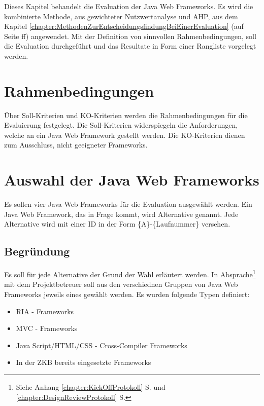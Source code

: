   Dieses Kapitel behandelt die Evaluation der Java Web Frameworks. Es wird die
  kombinierte Methode, aus gewichteter Nutzwertanalyse und \ac{AHP}, aus dem
  Kapitel \ref{chapter:MethodenZurEntscheidungsfindungBeiEinerEvaluation}
   (auf
  Seite \pageref{chapter:MethodenZurEntscheidungsfindungBeiEinerEvaluation}ff)
  angewendet. Mit der Definition von sinnvollen Rahmenbedingungen, soll die
  Evaluation durchgeführt und das Resultate in Form einer Rangliste vorgelegt
  werden.
    
  \section{Rahmenbedingungen}
  
  Über Soll-Kriterien und KO-Kriterien werden die Rahmenbedingungen für die
  Evaluierung festgelegt. Die Soll-Kriterien widerspiegeln die Anforderungen,
  welche an ein Java Web Framework gestellt werden. Die KO-Kriterien dienen zum
  Ausschluss, nicht geeigneter Frameworks.

  \section{Auswahl der Java Web Frameworks}
  
  Es sollen vier Java Web Frameworks für die Evaluation ausgewählt werden. Ein
  Java Web Framework, das in Frage kommt, wird Alternative genannt. Jede
  Alternative wird mit einer ID in der Form \{A\}-\{Laufnummer\} versehen.
  
  \subsection{Begründung}
  
  Es soll für jede Alternative der Grund der Wahl erläutert werden. In
  Absprache\footnote{Siehe Anhang \ref{chapter:KickOffProtokoll}
   S. \pageref{chapter:KickOffProtokoll} und
  \ref{chapter:DesignReviewProtokoll} 
  S. \pageref{chapter:DesignReviewProtokoll}} mit dem Projektbetreuer soll aus
  den verschiednen Gruppen von Java Web Frameworks jeweils eines gewählt werden.
  Es wurden folgende Typen definiert:
  
  \begin{itemize}
    \item \ac{RIA} - Frameworks
    \item MVC - Frameworks
    \item Java Script/HTML/CSS - Cross-Compiler Frameworks
    \item In der \ac{ZKB} bereits eingesetzte Frameworks
  \end{itemize}
  
